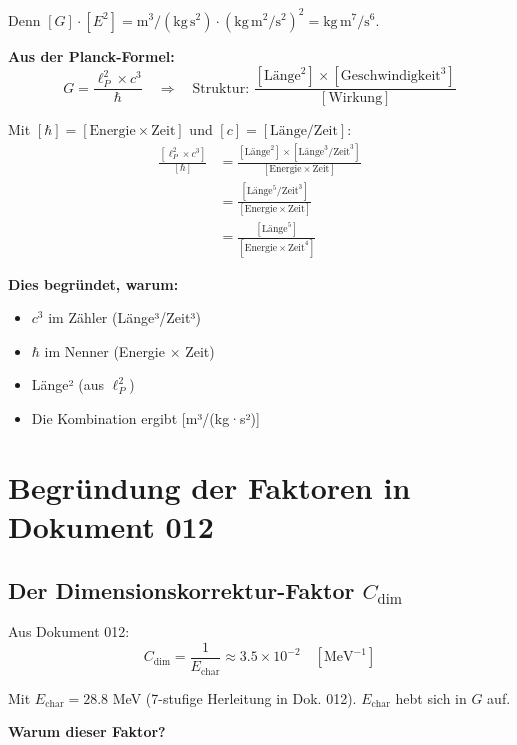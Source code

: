 	Denn $[G]\cdot[E^2] = \text{m}^3/(\text{kg}\,\text{s}^2) \cdot (\text{kg}\,\text{m}^2/\text{s}^2)^2 = \text{kg}\,\text{m}^7/\text{s}^6$.
	
	\textbf{Aus der Planck-Formel:}
	\begin{equation}
		G = \frac{\ell_P^2 \times c^3}{\hbar} \quad \Rightarrow \quad \text{Struktur: } \frac{[\text{Länge}^2] \times [\text{Geschwindigkeit}^3]}{[\text{Wirkung}]}
	\end{equation}
	
	Mit $[\hbar] = [\text{Energie} \times \text{Zeit}]$ und $[c] = [\text{Länge}/\text{Zeit}]$:
	\begin{align}
		\frac{[\ell_P^2 \times c^3]}{[\hbar]} &= \frac{[\text{Länge}^2] \times [\text{Länge}^3/\text{Zeit}^3]}{[\text{Energie} \times \text{Zeit}]} \\
		&= \frac{[\text{Länge}^5/\text{Zeit}^3]}{[\text{Energie} \times \text{Zeit}]} \\
		&= \frac{[\text{Länge}^5]}{[\text{Energie} \times \text{Zeit}^4]}
	\end{align}
	
	\textbf{Dies begründet, warum:}
	\begin{itemize}
		\item $c^3$ im Zähler (Länge³/Zeit³)
		\item $\hbar$ im Nenner (Energie × Zeit)
		\item Länge² (aus $\ell_P^2$)
		\item Die Kombination ergibt [m³/(kg·s²)]
	\end{itemize}
	
	\section{Begründung der Faktoren in Dokument 012}
	
	\subsection{Der Dimensionskorrektur-Faktor $C_{\text{dim}}$}
	
	Aus Dokument 012:
	\begin{equation}
		C_{\text{dim}} = \frac{1}{E_{\text{char}}} \approx 3.5 \times 10^{-2} \quad [\text{MeV}^{-1}]
	\end{equation}
	
	Mit $E_{\text{char}} = 28.8$ MeV (7-stufige Herleitung in Dok. 012). $E_{\text{char}}$ hebt sich in $G$ auf.
	
	\textbf{Warum dieser Faktor?}
	
